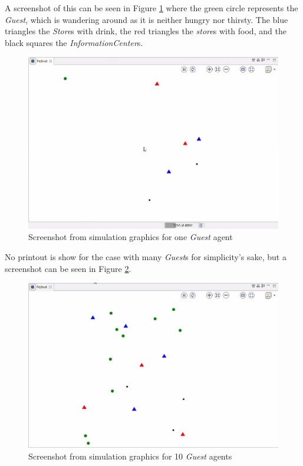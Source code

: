 \documentclass[a4paper]{article}
\begin{document}
A screenshot of this can be seen in Figure \ref{fig:1agent} where the green circle represents the \textit{Guest}, which is wandering around as it is neither hungry nor thirsty. The blue triangles the \textit{Store}s with drink, the red triangles the \textit{store}s with food, and the black squares the \textit{InformationCenter}s.

\begin{figure}[H]
    \centering
    \includegraphics[scale=0.3]{1agent.jpeg}
    \caption{Screenshot from simulation graphics for one \textit{Guest} agent}
    \label{fig:1agent}
\end{figure}

No printout is show for the case with many \textit{Guest}s for simplicity's sake, but a screenshot can be seen in Figure \ref{fig:manyagent}.

\begin{figure}[H]
    \centering
    \includegraphics[scale=0.3]{manyagent.jpeg}
    \caption{Screenshot from simulation graphics for 10 \textit{Guest} agents}
    \label{fig:manyagent}
\end{figure}
\end{document}
